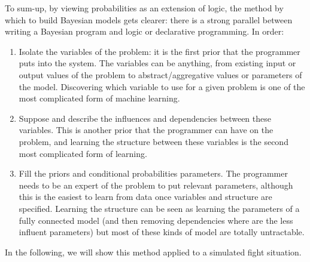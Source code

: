 To sum-up, by viewing probabilities as an extension of logic, the method by which to build Bayesian models gets clearer: there is a strong parallel between writing a Bayesian program and logic or declarative programming. In order:
\begin{enumerate}
    \item Isolate the variables of the problem: it is the first prior that the programmer puts into the system. The variables can be anything, from existing input or output values of the problem to abstract/aggregative values or parameters of the model. Discovering which variable to use for a given problem is one of the most complicated form of machine learning.
    \item Suppose and describe the influences and dependencies between these variables. This is another prior that the programmer can have on the problem, and learning the structure between these variables is the second most complicated form of learning.
    \item Fill the priors and conditional probabilities parameters. The programmer needs to be an expert of the problem to put relevant parameters, although this is the easiest to learn from data once variables and structure are specified. Learning the structure can be seen as learning the parameters of a fully connected model (and then removing dependencies where are the less influent parameters) but most of these kinds of model are totally untractable.
\end{enumerate}
In the following, we will show this method applied to a simulated  fight situation.



